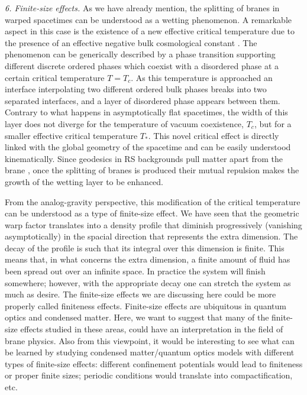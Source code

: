 \documentclass[a4paper,prl,showpacs,twocolumn]{revtex4}
\begin{document}
\noindent
{\it 6. Finite-size effects.}
As we have already mention, the splitting of branes in
warped spacetimes can be understood as a wetting 
phenomenon.
A remarkable aspect in this case is the existence of 
a new effective critical temperature due to the presence 
of an effective negative bulk cosmological constant 
\cite{Cam:2002}. 
The phenomenon can be generically described by a phase 
transition supporting different discrete ordered phases 
which coexist with a disordered phase at a certain 
critical temperature $T=T_c$. 
As this temperature is approached an interface interpolating 
two different ordered bulk phases breaks into two separated 
interfaces, and a layer of disordered phase appears between them.
Contrary to what happens in asymptotically flat spacetimes, 
the width of this layer does not diverge for the temperature of vacuum
coexistence, $T_c$, but for a smaller effective critical 
temperature $T_\ast$.
This novel critical effect is directly linked with the global
geometry of the spacetime and can be easily understood
kinematically.
Since geodesics in RS backgrounds pull matter apart
from the brane \cite{MucVisVol:2000},   
once the splitting of branes is produced their mutual
repulsion makes the growth of the wetting layer to be enhanced.


From the analog-gravity perspective, this modification of the critical
temperature can be understood as a type of finite-size effect.
We have seen that the geometric warp factor translates into a density
profile that diminish progressively (vanishing asymptotically)
in the spacial direction that represents the extra dimension.
The decay of the profile is such that its integral over this dimension 
is finite. This means that, in what concerns the extra dimension, a finite 
amount of fluid has been spread out over an infinite space.
In practice the system will finish somewhere; however, with the
appropriate decay one can stretch the system as much as desire.
The finite-size effects we are discussing here could be more properly
called finiteness effects.
Finite-size effects are ubiquitous in quantum optics and condensed matter. 
Here, we want to suggest that many of the finite-size effects studied
in these areas, could have an interpretation in the field of brane
physics. 
Also from this viewpoint, it would be interesting to see what
can be learned by studying condensed matter/quantum optics models
with different types of finite-size effects: different confinement 
potentials would lead to finiteness or proper finite sizes;  
periodic conditions would translate into compactification, etc.
 
\end{document}
